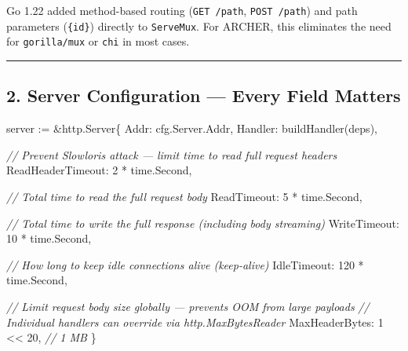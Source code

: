 \documentclass[
]{article}
\newenvironment{Shaded}{}{}
\newcommand{\CommentTok}[1]{\textcolor[rgb]{0.38,0.63,0.69}{\textit{#1}}}
\newcommand{\DecValTok}[1]{\textcolor[rgb]{0.25,0.63,0.44}{#1}}
\newcommand{\NormalTok}[1]{#1}
\newcommand{\OperatorTok}[1]{\textcolor[rgb]{0.40,0.40,0.40}{#1}}
\begin{document}
Go 1.22 added method-based routing (\texttt{GET\ /path},
\texttt{POST\ /path}) and path parameters (\texttt{\{id\}}) directly to
\texttt{ServeMux}. For ARCHER, this eliminates the need for
\texttt{gorilla/mux} or \texttt{chi} in most cases.

\begin{center}\rule{0.5\linewidth}{0.5pt}\end{center}

\hypertarget{server-configuration-every-field-matters}{%
\subsection{2. Server Configuration --- Every Field
Matters}\label{server-configuration-every-field-matters}}

\begin{Shaded}
\begin{Highlighting}[]
\NormalTok{server }\OperatorTok{:=} \OperatorTok{\&}\NormalTok{http}\OperatorTok{.}\NormalTok{Server}\OperatorTok{\{}
\NormalTok{    Addr}\OperatorTok{:}\NormalTok{    cfg}\OperatorTok{.}\NormalTok{Server}\OperatorTok{.}\NormalTok{Addr}\OperatorTok{,}
\NormalTok{    Handler}\OperatorTok{:}\NormalTok{ buildHandler}\OperatorTok{(}\NormalTok{deps}\OperatorTok{),}

    \CommentTok{// Prevent Slowloris attack — limit time to read full request headers}
\NormalTok{    ReadHeaderTimeout}\OperatorTok{:} \DecValTok{2} \OperatorTok{*}\NormalTok{ time}\OperatorTok{.}\NormalTok{Second}\OperatorTok{,}

    \CommentTok{// Total time to read the full request body}
\NormalTok{    ReadTimeout}\OperatorTok{:} \DecValTok{5} \OperatorTok{*}\NormalTok{ time}\OperatorTok{.}\NormalTok{Second}\OperatorTok{,}

    \CommentTok{// Total time to write the full response (including body streaming)}
\NormalTok{    WriteTimeout}\OperatorTok{:} \DecValTok{10} \OperatorTok{*}\NormalTok{ time}\OperatorTok{.}\NormalTok{Second}\OperatorTok{,}

    \CommentTok{// How long to keep idle connections alive (keep{-}alive)}
\NormalTok{    IdleTimeout}\OperatorTok{:} \DecValTok{120} \OperatorTok{*}\NormalTok{ time}\OperatorTok{.}\NormalTok{Second}\OperatorTok{,}

    \CommentTok{// Limit request body size globally — prevents OOM from large payloads}
    \CommentTok{// Individual handlers can override via http.MaxBytesReader}
\NormalTok{    MaxHeaderBytes}\OperatorTok{:} \DecValTok{1} \OperatorTok{\textless{}\textless{}} \DecValTok{20}\OperatorTok{,} \CommentTok{// 1 MB}
\OperatorTok{\}}
\end{Highlighting}
\end{Shaded}
\end{document}
